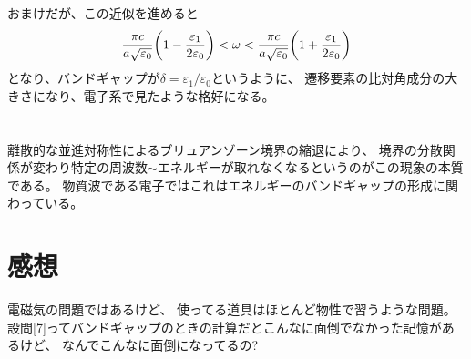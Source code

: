 \documentclass[../ap_2008.tex]{subfiles}
\begin{document}
おまけだが、この近似を進めると
\begin{equation}\begin{aligned}[b]
    \dfrac{\pi c}{a\sqrt{\varepsilon_0}}\qty(1-\frac{\varepsilon_1}{2\varepsilon_0})< \omega < \dfrac{\pi c}{a\sqrt{\varepsilon_0}}\qty(1+\frac{\varepsilon_1}{2\varepsilon_0})
\end{aligned}\end{equation}
となり、バンドギャップが\(\delta=\varepsilon_1/\varepsilon_0\)というように、
遷移要素の比対角成分の大きさになり、電子系で見たような格好になる。

\section{}
離散的な並進対称性によるブリュアンゾーン境界の縮退により、
境界の分散関係が変わり特定の周波数\(\sim\)エネルギーが取れなくなるというのがこの現象の本質である。
物質波である電子ではこれはエネルギーのバンドギャップの形成に関わっている。


\section*{感想}
電磁気の問題ではあるけど、
使ってる道具はほとんど物性で習うような問題。
設問[7]ってバンドギャップのときの計算だとこんなに面倒でなかった記憶があるけど、
なんでこんなに面倒になってるの?
\end{document}
